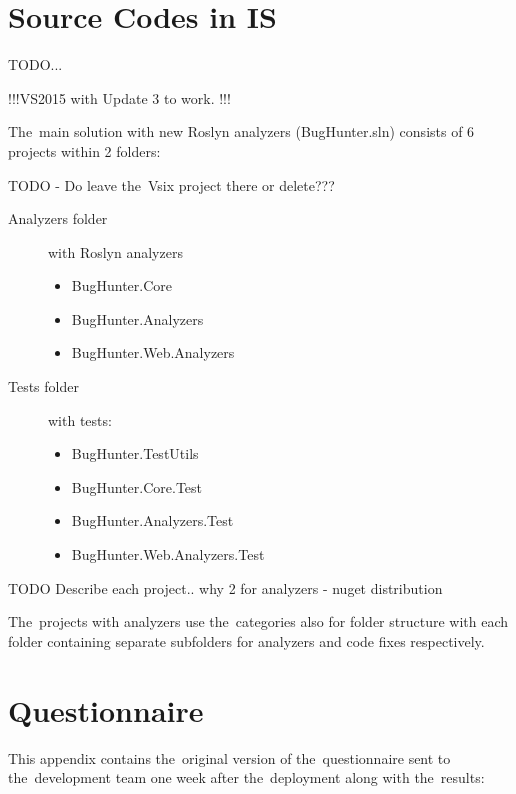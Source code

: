 \documentclass[
  digital, %
  table,   %
  lof,     %
  lot,     %
  oneside,
]{fithesis3}
\begin{document}
\chapter{Source Codes in IS}
\label{appendix:source-codes}
TODO...

!!!VS2015 with Update 3 to work. !!!

The~main solution with new Roslyn analyzers (BugHunter.sln) consists of 6 projects within 2 folders: 

TODO - Do leave the~Vsix project there or delete???

\begin{description}
  \item[Analyzers folder] with Roslyn analyzers
  \begin{itemize}
    \item BugHunter.Core
    \item BugHunter.Analyzers
    \item BugHunter.Web.Analyzers
  \end{itemize}
  
  \item[Tests folder] with tests:
  \begin{itemize}
    \item BugHunter.TestUtils
    \item BugHunter.Core.Test
    \item BugHunter.Analyzers.Test
    \item BugHunter.Web.Analyzers.Test
  \end{itemize}
\end{description}

TODO Describe each project.. why 2 for analyzers - nuget distribution

The~projects with analyzers use the~categories also for folder structure with each folder containing separate subfolders for analyzers and code fixes respectively.

\chapter{Questionnaire}
\label{appendix:questionnaire}
This appendix contains the~original version of the~questionnaire sent to the~development team one week after the~deployment along with the~results:
\end{document}

